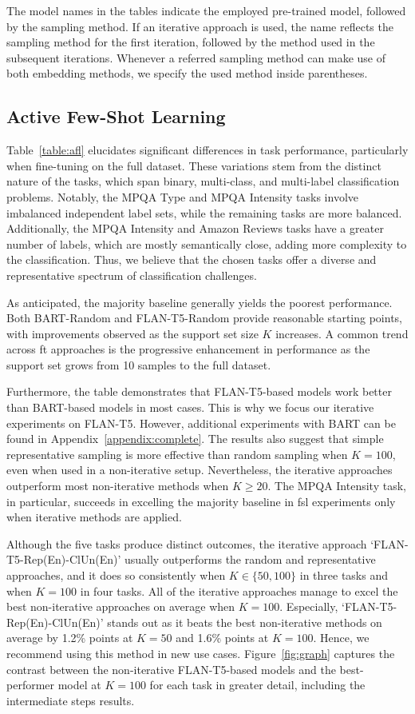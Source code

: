 \documentclass[11pt]{article}
\theoremstyle{definition}
\begin{document}
The model names in the tables indicate the employed pre-trained model, followed by the sampling method.
If an iterative approach is used, the name reflects the sampling method for the first iteration, followed by the method used in the subsequent iterations.
Whenever a referred sampling method can make use of both embedding methods, we specify the used method inside parentheses. 


\subsection{Active Few-Shot Learning}

Table~{\ref{table:afl}} elucidates significant differences in task performance, particularly when fine-tuning on the full dataset. These variations stem from the distinct nature of the tasks,
which span binary, multi-class, and multi-label classification problems.
Notably, the MPQA Type and MPQA Intensity tasks involve imbalanced independent label sets, while the remaining tasks are more balanced. Additionally, the MPQA Intensity and Amazon Reviews tasks have a greater number of labels, which are mostly semantically close, adding more complexity to the classification. 
Thus, we believe that the chosen tasks offer a diverse and representative spectrum of classification challenges.

As anticipated, the majority baseline generally yields the poorest performance. Both BART-Random and FLAN-T5-Random provide reasonable starting points, with improvements observed as the support set size $K$ increases. A common trend across \gls*{ft} approaches is the progressive enhancement in performance as the support set grows from 10 samples to the full dataset.

Furthermore, the table demonstrates that FLAN-T5-based models work better than BART-based models in most cases. This is why we focus our iterative experiments on FLAN-T5. However, additional experiments with BART can be found in Appendix~\ref{appendix:complete}.
The results also suggest that simple representative sampling is more effective than random sampling when $K=100$, even when used in a non-iterative setup. Nevertheless, the iterative approaches outperform most non-iterative methods when $K \ge 20$.
The MPQA Intensity task, in particular, succeeds in excelling the majority baseline in \gls*{fsl} experiments only when iterative methods are applied.

Although the five tasks produce distinct outcomes, the iterative approach `FLAN-T5-Rep(En)-ClUn(En)' usually outperforms the random and representative approaches, and it does so consistently when $K \in \{50, 100\}$ in three tasks and when $K=100$ in four tasks. All of the iterative approaches manage to excel the best non-iterative approaches on average when $K=100$. Especially, `FLAN-T5-Rep(En)-ClUn(En)' stands out as it beats the best non-iterative methods on average by 1.2\% points at $K=50$ and 1.6\% points at $K=100$.
Hence, we recommend using this method in new use cases.
Figure~\ref{fig:graph} captures the contrast between the non-iterative FLAN-T5-based models and the best-performer model at $K=100$ for each task in greater detail, including the intermediate steps results.
\end{document}
